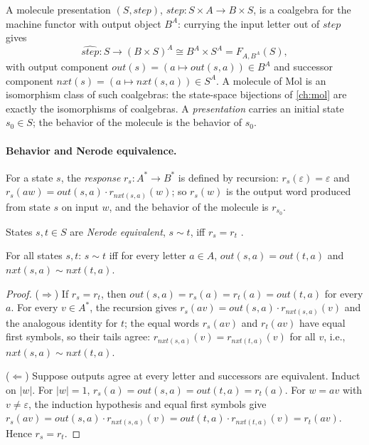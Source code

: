 \begin{definition}\label{def:molcoal}
A molecule presentation $(S, \mathit{step})$, $\mathit{step}\colon S \times A \to B
\times S$, is a coalgebra for the machine functor with output object $B^A$: currying
the input letter out of $\mathit{step}$ gives
\[
\widehat{\mathit{step}} \colon S \to (B \times S)^A \cong B^A \times S^A
= F_{A,B^A} (S),
\]
with output component $\mathit{out} (s) = (a \mapsto \mathit{out} (s,a)) \in B^A$ and
successor component $\mathit{nxt} (s) = (a \mapsto \mathit{nxt} (s,a)) \in S^A$. A
molecule of Mol is an isomorphism class of such coalgebras: the state-space bijections
of \autoref{ch:mol} are exactly the isomorphisms of coalgebras. A \emph{presentation}
carries an initial state $s_0 \in S$; the behavior of the molecule is the behavior of
$s_0$.
\end{definition}

\paragraph{Behavior and Nerode equivalence.}
For a state $s$, the \emph{response} $r_s \colon A^* \to B^*$ is defined by recursion:
$r_s (\varepsilon) = \varepsilon$ and
$r_s (aw) = \mathit{out} (s,a) \cdot r_{\mathit{nxt} (s,a)} (w)$; so $r_s (w)$ is the output
word produced from state $s$ on input $w$, and the behavior of the molecule is
$r_{s_0}$.

\begin{definition}\label{def:nerode}
States $s, t \in S$ are \emph{Nerode equivalent}, $s \sim t$, iff $r_s = r_t$
\citep{nerode}.
\end{definition}

\begin{lemma}\label{lem:onestep}
For all states $s, t$: $s \sim t$ iff for every letter $a \in A$,
$\mathit{out} (s,a) = \mathit{out} (t,a)$ and $\mathit{nxt} (s,a) \sim \mathit{nxt} (t,a)$.
\end{lemma}

\begin{proof}
($\Rightarrow$) If $r_s = r_t$, then $\mathit{out} (s,a) = r_s (a) = r_t (a) =
\mathit{out} (t,a)$ for every $a$. For every $v \in A^*$, the recursion gives
$r_s (av) = \mathit{out} (s,a) \cdot r_{\mathit{nxt} (s,a)} (v)$ and the analogous identity
for $t$; the equal words $r_s (av)$ and $r_t (av)$ have equal first symbols, so their
tails agree: $r_{\mathit{nxt} (s,a)} (v) = r_{\mathit{nxt} (t,a)} (v)$ for all $v$, i.e.,
$\mathit{nxt} (s,a) \sim \mathit{nxt} (t,a)$.

($\Leftarrow$) Suppose outputs agree at every letter and successors are equivalent.
Induct on $|w|$. For $|w| = 1$, $r_s (a) = \mathit{out} (s,a) = \mathit{out} (t,a) = r_t (a)$.
For $w = av$ with $v \neq \varepsilon$, the induction hypothesis and equal first symbols
give $r_s (av) = \mathit{out} (s,a) \cdot r_{\mathit{nxt} (s,a)} (v) = \mathit{out} (t,a)
\cdot r_{\mathit{nxt} (t,a)} (v) = r_t (av)$. Hence $r_s = r_t$.
\end{proof}

